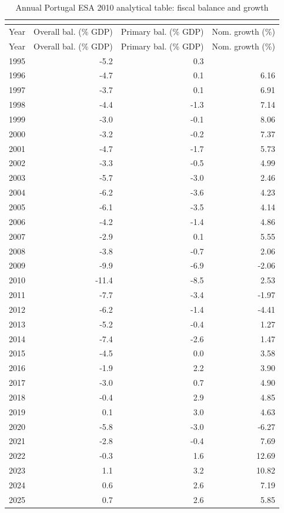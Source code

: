 \normalsize
\medskip
\footnotesize
\begin{longtable}{rrrr}
\caption{Annual Portugal ESA 2010 analytical table: fiscal balance and growth}\\
\label{tab:annual-fiscal-growth}\\
\toprule
Year & Overall bal. (\% GDP) & Primary bal. (\% GDP) & Nom. growth (\%) \\
\midrule
\endfirsthead
\toprule
Year & Overall bal. (\% GDP) & Primary bal. (\% GDP) & Nom. growth (\%) \\
\midrule
\endhead
1995 & -5.2 & 0.3 &  \\
1996 & -4.7 & 0.1 & 6.16 \\
1997 & -3.7 & 0.1 & 6.91 \\
1998 & -4.4 & -1.3 & 7.14 \\
1999 & -3.0 & -0.1 & 8.06 \\
2000 & -3.2 & -0.2 & 7.37 \\
2001 & -4.7 & -1.7 & 5.73 \\
2002 & -3.3 & -0.5 & 4.99 \\
2003 & -5.7 & -3.0 & 2.46 \\
2004 & -6.2 & -3.6 & 4.23 \\
2005 & -6.1 & -3.5 & 4.14 \\
2006 & -4.2 & -1.4 & 4.86 \\
2007 & -2.9 & 0.1 & 5.55 \\
2008 & -3.8 & -0.7 & 2.06 \\
2009 & -9.9 & -6.9 & -2.06 \\
2010 & -11.4 & -8.5 & 2.53 \\
2011 & -7.7 & -3.4 & -1.97 \\
2012 & -6.2 & -1.4 & -4.41 \\
2013 & -5.2 & -0.4 & 1.27 \\
2014 & -7.4 & -2.6 & 1.47 \\
2015 & -4.5 & 0.0 & 3.58 \\
2016 & -1.9 & 2.2 & 3.90 \\
2017 & -3.0 & 0.7 & 4.90 \\
2018 & -0.4 & 2.9 & 4.85 \\
2019 & 0.1 & 3.0 & 4.63 \\
2020 & -5.8 & -3.0 & -6.27 \\
2021 & -2.8 & -0.4 & 7.69 \\
2022 & -0.3 & 1.6 & 12.69 \\
2023 & 1.1 & 3.2 & 10.82 \\
2024 & 0.6 & 2.6 & 7.19 \\
2025 & 0.7 & 2.6 & 5.85 \\
\bottomrule
\end{longtable}
\normalsize
